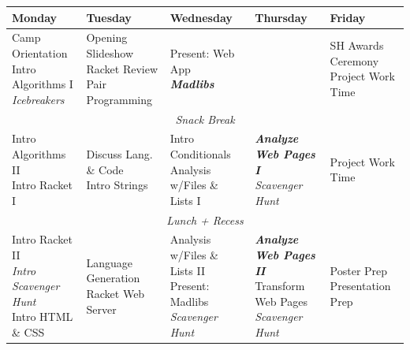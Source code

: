 \newcommand{\afk}[1]{\textit{#1}}
\newcommand{\proj}[1]{\textit{\textbf{#1}}}
\renewcommand\cellalign{lt}

\begin{table}[t]
\begin{tabular}{|l|l|l|l|l|}
\hline
\textbf{Monday} 	& \textbf{Tuesday} 	& \textbf{Wednesday} 	& \textbf{Thursday} 		& \textbf{Friday} \\ \hline \hline

\makecell{Camp Orientation \\ Intro Algorithms I \\ \afk{Icebreakers}}
	& \makecell{Opening Slideshow \\ Racket Review \\ Pair Programming} 
	& \makecell{Present: Web App \\ \proj{Madlibs}}
	& \makecell{RegExp}
	& \makecell{SH Awards Ceremony \\ Project Work Time}
	\\ \hline

\multicolumn{5}{|c|}{\afk{Snack Break}}
	\\ \hline

\makecell{Intro Algorithms II \\ Intro Racket I}
	& \makecell{Discuss Lang. \& Code \\ Intro Strings}
	& \makecell{Intro Conditionals \\ Analysis w/Files \& Lists I}
	& \makecell{\proj{Analyze Web Pages I} \\ \afk{Scavenger Hunt}}
	& Project Work Time
	\\ \hline

\multicolumn{5}{|c|}{\afk{Lunch + Recess}}
	\\ \hline

\makecell{Intro Racket II \\ \afk{Intro Scavenger Hunt} \\ Intro HTML \& CSS}
	& \makecell{Language Generation \\ Racket Web Server}
	& \makecell{Analysis w/Files \& Lists II \\ Present: Madlibs \\ \afk{Scavenger Hunt}}
	& \makecell{\proj{Analyze Web Pages II} \\ Transform Web Pages \\ \afk{Scavenger Hunt}}
	& \makecell{Poster Prep \\ Presentation Prep}
	\\ \hline


\end{tabular}
\end{table}
